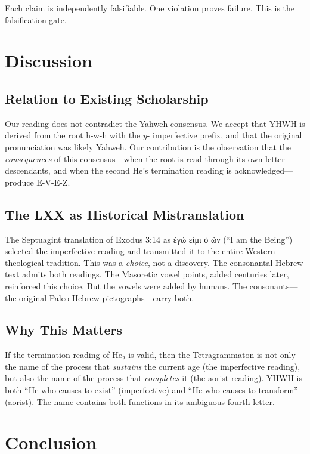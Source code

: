 \documentclass[12pt]{article}
\begin{document}
Each claim is independently falsifiable. One violation proves failure. This is the falsification gate.

\section{Discussion}

\subsection{Relation to Existing Scholarship}

Our reading does not contradict the Yahweh consensus. We accept that YHWH is derived from the root h-w-h with the $y$- imperfective prefix, and that the original pronunciation was likely Yahweh. Our contribution is the observation that the \textit{consequences} of this consensus---when the root is read through its own letter descendants, and when the second He's termination reading is acknowledged---produce E-V-E-Z.

\subsection{The LXX as Historical Mistranslation}

The Septuagint translation of Exodus 3:14 as ἐγώ εἰμι ὁ ὤν (``I am the Being'') selected the imperfective reading and transmitted it to the entire Western theological tradition. This was a \textit{choice}, not a discovery. The consonantal Hebrew text admits both readings. The Masoretic vowel points, added centuries later, reinforced this choice. But the vowels were added by humans. The consonants---the original Paleo-Hebrew pictographs---carry both.

\subsection{Why This Matters}

If the termination reading of He$_2$ is valid, then the Tetragrammaton is not only the name of the process that \textit{sustains} the current age (the imperfective reading), but also the name of the process that \textit{completes} it (the aorist reading). YHWH is both ``He who causes to exist'' (imperfective) and ``He who causes to transform'' (aorist). The name contains both functions in its ambiguous fourth letter.

\section{Conclusion}
\end{document}
